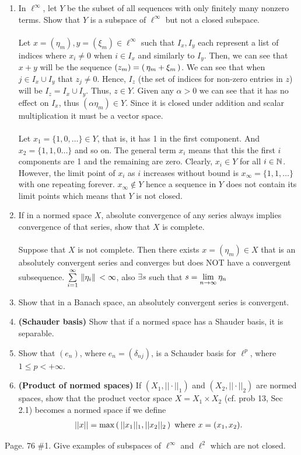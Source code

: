 \documentclass[10pt,a4paper]{report}
\newcommand{\NORM}[1]{\,\left \Vert #1 \right \Vert\,}
\begin{document}
\begin{enumerate}
	\item In $\ell^\infty$, let $Y$ be the subset of all sequences with only finitely many nonzero terms.  Show that $Y$ is a subspace of $\ell^\infty$ but not a closed subspace. \\
	\\
	Let $x = (\eta_m), y=(\xi_m) \in \ell^\infty$ such that $I_x, I_y$ each represent a list of indices where $x_i \ne 0$ when $i \in I_x$ and similarly to $I_y$.  Then, we can see that $x+y$ will be the sequence $(z_m) = \left (\, \eta_m + \xi_m \,\right )$.  We can see that when $j \in I_x \cup I_y$ that $z_j \ne 0$.  Hence, $I_z$ (the set of indices for non-zero entries in $z$) will be $I_z=I_x\cup I_y$.  Thus, $z \in Y$.  Given any $\alpha > 0$ we can see that it has no effect on $I_x$, thus $(\alpha \eta_m) \in Y$.  Since it is closed under addition and scalar multiplication it must be a vector space.\\
	\\
	Let $x_1= \{1,0,\dots \} \in Y$, that is, it has 1 in the first component.  And $x_2 = \{1,1,0\dots\}$ and so on.  The general term $x_i$ means that this the first $i$ components are 1 and the remaining are zero.  Clearly, $x_i \in Y$ for all $i\in\mathbb{N}$.  However, the limit point of $x_i$ as $i$ increases without bound is $x_\infty=\{1, 1, \dots\}$ with one repeating forever.  $x_\infty \not \in Y$ hence a sequence in $Y$ does not contain its limit points which means that $Y$ is not closed.
	\\
	
	\setcounter{enumi}{7}
	\item If in a normed space $X$, absolute convergence of any series always implies convergence of that series, show that $X$ is complete.\\
	\\
	Suppose that $X$ is not complete.  Then there exists $x = (\eta_m) \in X$ that is an absolutely convergent series and converges but does NOT have a convergent subsequence.  $\SUM{i=1}{\infty} \NORM{\eta_i} < \infty$, also $\exists s$ such that $s = \underset{n\to \infty}\lim\, \eta_n$ 
	
	\item Show that in a Banach space, an absolutely convergent series is convergent.
	
	\item \textbf{(Schauder basis)} Show that if a normed space has a Shauder basis, it is separable.
	
	\item Show that $(e_n)$, where $e_n=(\delta_{nj})$, is a Schauder basis for $\ell^p$, where $1 \le p < +\infty$.
	
	\setcounter{enumi}{14}
	\item \textbf{(Product of normed spaces)}  If $(X_1,||\cdot||_1)$ and $(X_2, ||\cdot||_2)$ are normed spaces, show that the product vector space $X=X_1\times X_2$ (cf. prob 13, Sec 2.1) becomes a normed space if we define
	\begin{align*}
		 ||x||=\max\left (\, ||x_1||_1, ||x_2||_2 \,\right ) \text{ where } x=(x_1, x_2).
	\end{align*}
\end{enumerate}

\newpage

Page. 76 \#1.  Give examples of subspaces of $\ell^\infty$ and $\ell^2$ which are not closed.
\end{document}

